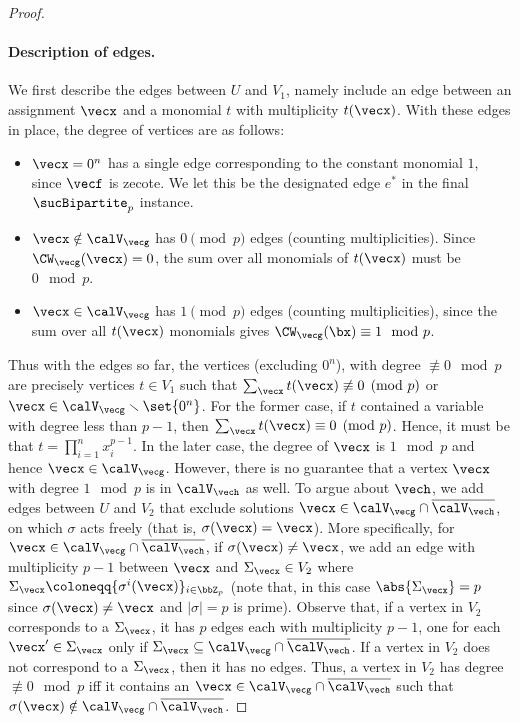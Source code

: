 \begin{proof}
 \paragraph{Description of edges.} We first describe the edges between $U$ and $V_1$, namely include an
 edge between an assignment $\vecx$ and a monomial $t$ with
 multiplicity $t(\vecx)$. With these edges in place, the degree of vertices are as follows:\vspace{-2mm}
 \begin{itemize}[leftmargin=0.5cm]
	\item $\vecx = 0^n$ has a single edge corresponding to the constant monomial $1$, since $\vecf$ is zecote. We let this be the designated edge $e^*$ in the final $\sucBipartite_p$ instance.
	\item $\vecx \notin \calV_{\vecg}$ has $0 \pmod p$ edges
	(counting multiplicities). Since $\CW_{\vecg}(\vecx) = 0$, the sum over all monomials of $t(\vecx)$ must be $0 \mod{p}$.
	\item $\vecx \in \calV_{\vecg}$ has $1 \pmod p$ edges (counting multiplicities), since the sum over all $t(\vecx)$ monomials gives $\CW_{\vecg}(\bx) \equiv 1 \mod{p}$.
 \end{itemize}
 Thus with the edges so far, the vertices (excluding $0^n$), with degree $\not\equiv 0 \mod{p}$ are precisely vertices  $t \in V_1$ such that $\sum_{\vecx} t(\vecx) \not\equiv 0 \pmod p$ or $\vecx \in \calV_{\vecg} \smallsetminus \set{0^n}$. For the former case, if $t$ contained a variable with degree less than $p-1$, then $\sum_{\vecx} t(\vecx) \equiv 0 \pmod p$. Hence, it must be that $t = \prod\limits_{i = 1}^{ n} x_i^{p-1}$. In the later case, the degree of $\vecx $ is $1 \mod{p}$ and hence $\vecx \in \calV_{\vecg}$. 
 However, there is no guarantee that a vertex $\vecx$ with degree $1 \mod{p}$ is in $\calV_{\vech}$ as well. To argue
 about $\vech$, we add edges between $U$ and $V_2$ that exclude solutions $\vecx \in \calV_{\vecg} \cap \overline{\calV_{\vech}}$, on which $\sigma$ acts freely (that is, $\sigma(\vecx) = \vecx$). More specifically, for
 $\vecx \in \calV_{\vecg} \cap \overline{\calV_{\vech}}$, if $\sigma(\vecx) \ne \vecx$,
  we add an edge with multiplicity $p-1$ between $\vecx$ and $\Sigma_{\vecx} \in V_2$ where $\Sigma_{\vecx} \coloneqq \{\sigma^i(\vecx)\}_{i \in \bbZ_p}$ (note that, in this case $\abs{\Sigma_{\vecx}} = p$ since $\sigma(\vecx) \ne \vecx$ and $|\sigma| = p$ is prime).
 Observe that, if a vertex in $V_2$ corresponds
 to a $\Sigma_{\vecx}$, it has $p$ edges each with multiplicity $p-1$, one for each
 $\vecx' \in \Sigma_{\vecx}$ only if $\Sigma_{\vecx} \subseteq \calV_{\vecg} \cap \overline{\calV_{\vech}}$. If a vertex in $V_2$ does not correspond to a
 $\Sigma_{\vecx}$, then it has no edges. Thus, a vertex in $V_2$ has degree $\not\equiv 0 \mod{p}$ iff it contains an $\vecx \in \calV_{\vecg} \cap \overline{\calV_{\vech}}$ such that $\sigma(\vecx) \notin \calV_{\vecg} \cap \overline{\calV_{\vech}}$.


\end{proof}
